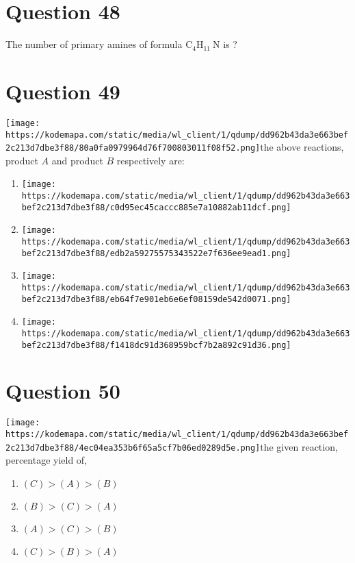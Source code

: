 \documentclass{article}
\begin{document}
\section*{Question 48}
The number of primary amines of formula \(\mathrm{C}_4 \mathrm{H}_{11} \mathrm{~N}\) is ? 
\begin{enumerate}[label=(\alph*)]
\end{enumerate}
\newpage
\section*{Question 49}
\texttt{[image: https://kodemapa.com/static/media/wl\_client/1/qdump/dd962b43da3e663bef2c213d7dbe3f88/80a0fa0979964d76f700803011f08f52.png]}\newlineIn the above reactions, product \(A\) and product \(B\) respectively are:
\begin{enumerate}[label=(\alph*)]
\item \texttt{[image: https://kodemapa.com/static/media/wl\_client/1/qdump/dd962b43da3e663bef2c213d7dbe3f88/c0d95ec45caccc885e7a10882ab11dcf.png]}
\item \texttt{[image: https://kodemapa.com/static/media/wl\_client/1/qdump/dd962b43da3e663bef2c213d7dbe3f88/edb2a59275575343522e7f636ee9ead1.png]}
\item \texttt{[image: https://kodemapa.com/static/media/wl\_client/1/qdump/dd962b43da3e663bef2c213d7dbe3f88/eb64f7e901eb6e6ef08159de542d0071.png]}
\item \texttt{[image: https://kodemapa.com/static/media/wl\_client/1/qdump/dd962b43da3e663bef2c213d7dbe3f88/f1418dc91d368959bcf7b2a892c91d36.png]}
\end{enumerate}
\newpage
\section*{Question 50}
\texttt{[image: https://kodemapa.com/static/media/wl\_client/1/qdump/dd962b43da3e663bef2c213d7dbe3f88/4ec04ea353b6f65a5cf7b06ed0289d5e.png]}\newlineConsider the given reaction, percentage yield of, 
\begin{enumerate}[label=(\alph*)]
\item \((C)>(A)>(B)\)
\item \((B)>(C)>(A)\)
\item \((A)>(C)>(B)\)
\item \((C)>(B)>(A)\)
\end{enumerate}
\newpage
\end{document}
